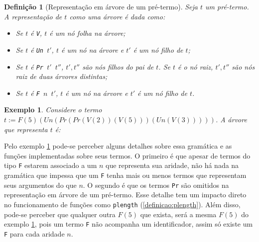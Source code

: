 \documentclass{article}
\newtheorem{definicao}{Definição}
\newtheorem{exemplo}{Exemplo}
\begin{document}
\begin{definicao}[Representação em árvore de um pré-termo]
	Seja $t$ um pré-termo. A representação de $t$ como uma árvore é dada como:

	\begin{itemize}
		\item Se $t$ é \texttt{V}, $t$ é um nó folha na árvore;
		\item Se $t$ é \texttt{Un $t'$}, $t$ é um nó na árvore e $t'$ é um nó filho de $t$;
		\item Se $t$ é \texttt{Pr $t'$ $t''$}, $t',t''$ são nós filhos do pai de $t$. Se $t$ é o nó raiz, $t',t''$ são nós raiz de duas árvores distintas;
		\item Se $t$ é \texttt{F $n$ $t'$}, $t$ é um nó na árvore e $t'$ é um nó filho de $t$.
	\end{itemize}
	\label{definicao:pre-termo_arvore}

\end{definicao}
\begin{exemplo}
	Considere o termo $t := F (5) (Un (Pr (Pr (V (2)) (V (5))) (Un (V (3)))))$. A árvore que representa $t$ é:
	\label{exemplo:pre-termo_arvore}
\end{exemplo}

\hspace*{\fill}
\hspace*{\fill}

Pelo exemplo \ref{exemplo:pre-termo_arvore} pode-se perceber alguns detalhes sobre essa gramática e as funções implementadas sobre seus termos. O primeiro é que apesar de termos do tipo \texttt{F} estarem associado a um $n$ que representa sua aridade, não há nada na gramática que impessa que um \texttt{F} tenha mais ou menos termos que representam seus argumentos do que $n$. O segundo é que os termos \texttt{Pr} são omitidos na representação em árvore de um pré-termo. Esse detalhe tem um impacto direto no funcionamento de funções como \texttt{plength} (\ref{definicao:plength}). Além disso, pode-se perceber que qualquer outra $F (5)$ que exista, será a mesma $F (5)$ do exemplo \ref{exemplo:pre-termo_arvore}, pois um termo \texttt{F} não acompanha um identificador, assim só existe um \texttt{F} para cada aridade $n$.
\end{document}
